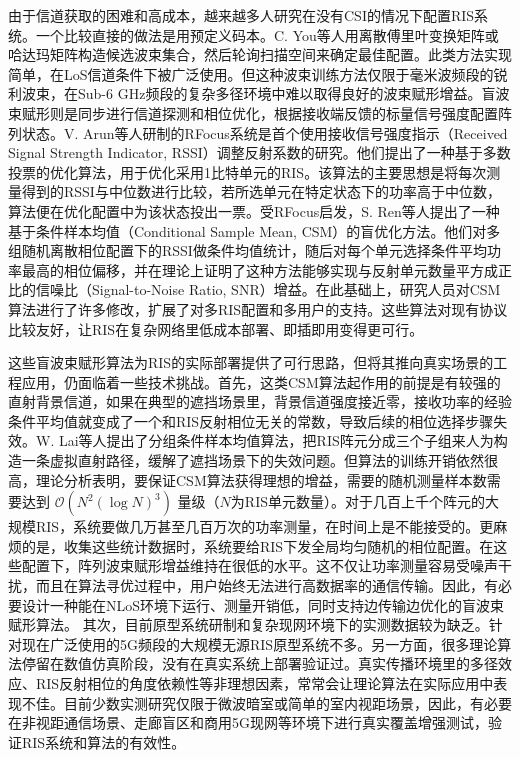 由于信道获取的困难和高成本，越来越多人研究在没有CSI的情况下配置RIS系统。一个比较直接的做法是用预定义码本。C. You等人用离散傅里叶变换矩阵或哈达玛矩阵构造候选波束集合，然后轮询扫描空间来确定最佳配置\cite{you2020fast}。此类方法实现简单，在LoS信道条件下被广泛使用。但这种波束训练方法仅限于毫米波频段的锐利波束\cite{wang2023hierarchical}，在Sub-6 GHz频段的复杂多径环境中难以取得良好的波束赋形增益。盲波束赋形则是同步进行信道探测和相位优化，根据接收端反馈的标量信号强度配置阵列状态。V. Arun等人研制的RFocus系统是首个使用接收信号强度指示（Received Signal Strength Indicator, RSSI）调整反射系数的研究。他们提出了一种基于多数投票的优化算法，用于优化采用1比特单元的RIS。该算法的主要思想是将每次测量得到的RSSI与中位数进行比较，若所选单元在特定状态下的功率高于中位数，算法便在优化配置中为该状态投出一票\cite{arun2020rfocus}。受RFocus启发，S. Ren等人提出了一种基于条件样本均值（Conditional Sample Mean, CSM）的盲优化方法\cite{ren2023configuring}。他们对多组随机离散相位配置下的RSSI做条件均值统计，随后对每个单元选择条件平均功率最高的相位偏移，并在理论上证明了这种方法能够实现与反射单元数量平方成正比的信噪比（Signal-to-Noise Ratio, SNR）增益。在此基础上，研究人员对CSM算法进行了许多修改，扩展了对多RIS配置\cite{xu2024coordinating}和多用户\cite{xu2024blind}的支持。这些算法对现有协议比较友好，让RIS在复杂网络里低成本部署、即插即用变得更可行。

这些盲波束赋形算法为RIS的实际部署提供了可行思路，但将其推向真实场景的工程应用，仍面临着一些技术挑战。首先，这类CSM算法起作用的前提是有较强的直射背景信道，如果在典型的遮挡场景里，背景信道强度接近零，接收功率的经验条件平均值就变成了一个和RIS反射相位无关的常数，导致后续的相位选择步骤失效。W. Lai等人提出了分组条件样本均值算法，把RIS阵元分成三个子组来人为构造一条虚拟直射路径，缓解了遮挡场景下的失效问题\cite{lai2025adaptive}。但算法的训练开销依然很高，理论分析表明，要保证CSM算法获得理想的增益，需要的随机测量样本数需要达到 $\mathcal{O}(N^2 (\log N)^3)$ 量级（$N$为RIS单元数量）\cite{ren2023configuring}。对于几百上千个阵元的大规模RIS，系统要做几万甚至几百万次的功率测量，在时间上是不能接受的。更麻烦的是，收集这些统计数据时，系统要给RIS下发全局均匀随机的相位配置。在这些配置下，阵列波束赋形增益维持在很低的水平。这不仅让功率测量容易受噪声干扰，而且在算法寻优过程中，用户始终无法进行高数据率的通信传输。因此，有必要设计一种能在NLoS环境下运行、测量开销低，同时支持边传输边优化的盲波束赋形算法。
其次，目前原型系统研制和复杂现网环境下的实测数据较为缺乏。针对现在广泛使用的5G频段的大规模无源RIS原型系统不多。另一方面，很多理论算法停留在数值仿真阶段，没有在真实系统上部署验证过。真实传播环境里的多径效应、RIS反射相位的角度依赖性等非理想因素，常常会让理论算法在实际应用中表现不佳。目前少数实测研究仅限于微波暗室或简单的室内视距场景，因此，有必要在非视距通信场景、走廊盲区和商用5G现网等环境下进行真实覆盖增强测试，验证RIS系统和算法的有效性。


